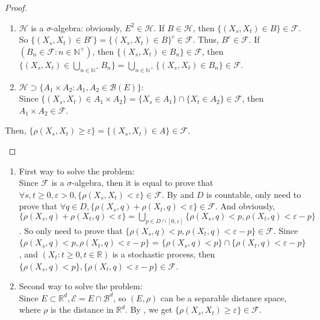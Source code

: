 \documentclass{ctexart}
\begin{document}
\begin{proof}
\begin{enumerate}
\begin{enumerate}
				\item \(\mathscr{H}\) is a \(\sigma\)-algebra: obviously, \(E^2 \in \mathscr{H}\).
					If \(B \in \mathscr{H}\), then \(\{(X_s,X_t) \in B \} \in \mathscr{F}\).
					So \(\{(X_s,X_t) \in B^c\} = \{(X_s,X_t) \in B\}^c \in \mathscr{F}\).
					Thus, \(B^c \in \mathscr{F}\).
					If \((B_n \in \mathscr{F}: n \in \mathbb{N}^{+})\), then \(\{(X_s,X_t) \in B_n\} \in \mathscr{F}\),
					then \(\{(X_s,X_t) \in \bigcup_{n \in \mathbb{N}^{+}} B_n\} = \bigcup_{n \in \mathbb{N}^{+}} \{(X_s,X_t) \in B_n\} \in \mathscr{F}\).
				\item \(\mathscr{H} \supset \{A_1 \times A_2: A_1, A_2 \in \mathscr{B}(E)\}\):\\
					Since \(\{(X_s,X_t) \in A_1 \times A_2\} = \{X_s \in A_1\} \cap \{X_t \in A_2\} \in \mathscr{F}\),
					then \(A_1 \times A_2 \in \mathscr{F}\).
			\end{enumerate}

			Then, \(\{\rho(X_s,X_t) \geq \varepsilon\} = \{(X_s,X_t) \in A\} \in \mathscr{F}\).

	\end{enumerate}
\end{proof}

\begin{solution}
	\begin{enumerate}
		\item First way to solve the problem:\\
			Since \(\mathscr{F} \) is a \(\sigma\)-algebra, then it is equal to
			prove that \(\forall s,t \geq 0, \varepsilon > 0, \{\rho(X_s,X_t) < \varepsilon\} \in \mathscr{F}\).
			By  and \(D\) is countable, only need to prove that \(\forall q \in D, \{\rho(X_s,q)+ \rho(X_t,q) < \varepsilon\} \in \mathscr{F}\).
			And obviously, \(\{\rho(X_s,q) + \rho(X_t,q) < \varepsilon\} = \bigcup_{p \in D \cap [0, \varepsilon]}\{\rho(X_s,q)< p, \rho(X_t,q)< \varepsilon - p\}\).
			So only need to prove that \(\{\rho(X_s,q) < p , \rho(X_t,q) < \varepsilon - p\} \in \mathscr{F}\).
			Since \(\{\rho(X_s,q) < p , \rho(X_t,q) < \varepsilon - p\}\)
			= \(\{\rho(X_s,q) < p\}\cap \{\rho(X_t,q) < \varepsilon - p\} \),
			and \((X_t: t \geq 0, t \in \mathbb{R})\) is a stochastic process,
			then \(\{\rho(X_s,q) < p\}, \{\rho(X_t,q) < \varepsilon - p\} \in \mathscr{F}\).
		\item Second way to solve the problem:\\
			Since \(E \subset \mathbb{R}^d, \mathscr{E} = E \cap \mathscr{B}^d\), so \((E, \rho)\) can be a separable distance space,
			where \(\rho\) is the distance in \(\mathbb{R}^d\). By , we get \(\{\rho(X_s,X_t) \geq \varepsilon\} \in \mathscr{F} \).
	\end{enumerate}
\end{solution}
\end{document}

